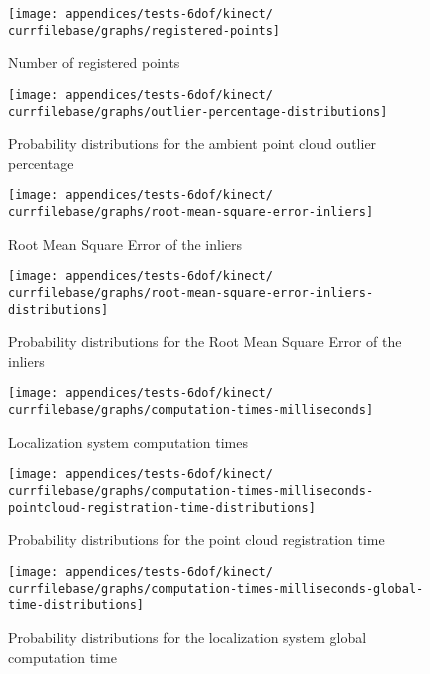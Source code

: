 \begin{figure}[H]
	\centering
	\texttt{[image: appendices/tests-6dof/kinect/\\currfilebase/graphs/registered-points]}
	\caption{Number of registered points}
\end{figure}

\begin{figure}[H]
	\centering
	\texttt{[image: appendices/tests-6dof/kinect/\\currfilebase/graphs/outlier-percentage-distributions]}
	\caption{Probability distributions for the ambient point cloud outlier percentage}
\end{figure}


\begin{figure}[H]
	\centering
	\texttt{[image: appendices/tests-6dof/kinect/\\currfilebase/graphs/root-mean-square-error-inliers]}
	\caption{Root Mean Square Error of the inliers}
\end{figure}

\begin{figure}[H]
	\centering
	\texttt{[image: appendices/tests-6dof/kinect/\\currfilebase/graphs/root-mean-square-error-inliers-distributions]}
	\caption{Probability distributions for the Root Mean Square Error of the inliers}
\end{figure}


\begin{figure}[H]
	\centering
	\texttt{[image: appendices/tests-6dof/kinect/\\currfilebase/graphs/computation-times-milliseconds]}
	\caption{Localization system computation times}
\end{figure}

\begin{figure}[H]
	\centering
	\texttt{[image: appendices/tests-6dof/kinect/\\currfilebase/graphs/computation-times-milliseconds-pointcloud-registration-time-distributions]}
	\caption{Probability distributions for the point cloud registration time}
\end{figure}

\begin{figure}[H]
	\centering
	\texttt{[image: appendices/tests-6dof/kinect/\\currfilebase/graphs/computation-times-milliseconds-global-time-distributions]}
	\caption{Probability distributions for the localization system global computation time}
\end{figure}
